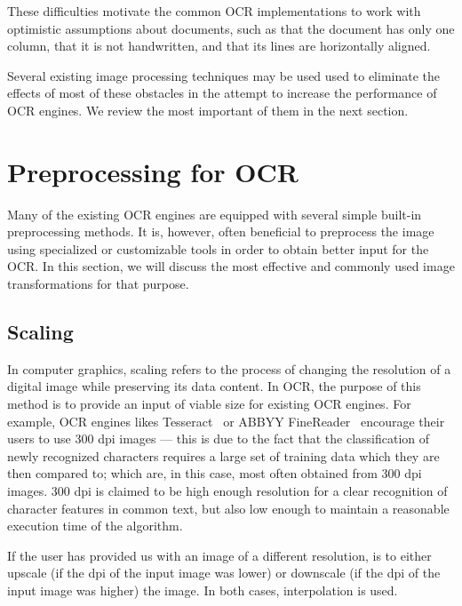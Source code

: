 These difficulties motivate the common OCR implementations to work with optimistic assumptions about documents, such as that the document has only one column, that it is not handwritten, and that its lines are horizontally aligned.

Several existing image processing techniques may be used used to eliminate the effects of most of these obstacles in the attempt to increase the performance of OCR engines. We review the most important of them in the next section.

\section{Preprocessing for OCR}

Many of the existing OCR engines are equipped with several simple built-in preprocessing methods. It is, however, often beneficial to preprocess the image using specialized or customizable tools in order to obtain better input for the OCR. In this section, we will discuss the most effective and commonly used image transformations for that purpose.

\subsection{Scaling} \label{scaling}

In computer graphics, scaling refers to the process of changing the resolution of a digital image while preserving its data content. In OCR, the purpose of this method is to provide an input of viable size for existing OCR engines. For example, OCR engines likes Tesseract~\cite{TesseractQual} or ABBYY FineReader~\cite{ABBYYdpi} encourage their users to use 300 dpi images --- this is due to the fact that the classification of newly recognized characters requires a large set of training data which they are then compared to; which are, in this case, most often obtained from 300 dpi images. 300 dpi is claimed to be high enough resolution for a clear recognition of character features in common text, but also low enough to maintain a reasonable execution time of the algorithm.

If the user has provided us with an image of a different resolution,  is to either upscale (if the dpi of the input image was lower) or downscale (if the dpi of the input image was higher) the image. In both cases, interpolation is used.

